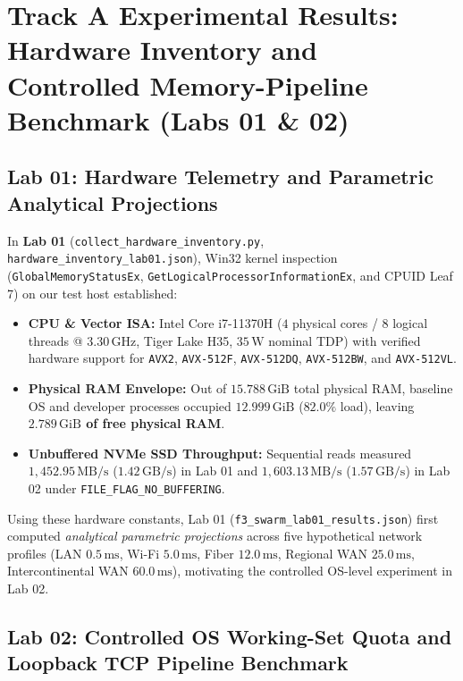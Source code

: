 \documentclass[10pt,a4paper]{article}
\begin{document}
\section{Track A Experimental Results: Hardware Inventory and Controlled Memory-Pipeline Benchmark (Labs 01 \& 02)}

\subsection{Lab 01: Hardware Telemetry and Parametric Analytical Projections}
\label{sec:exp_lab01}

In \textbf{Lab 01} (\texttt{collect\_hardware\_inventory.py}, \texttt{hardware\_inventory\_lab01.json}), Win32 kernel inspection (\texttt{GlobalMemoryStatusEx}, \texttt{GetLogicalProcessorInformationEx}, and CPUID Leaf 7) on our test host established:
\begin{itemize}
    \item \textbf{CPU \& Vector ISA:} Intel Core i7-11370H ($4$ physical cores / $8$ logical threads @ $3.30\,\text{GHz}$, Tiger Lake H35, $35\,\text{W}$ nominal TDP) with verified hardware support for \texttt{AVX2}, \texttt{AVX-512F}, \texttt{AVX-512DQ}, \texttt{AVX-512BW}, and \texttt{AVX-512VL}.
    \item \textbf{Physical RAM Envelope:} Out of $15.788\,\text{GiB}$ total physical RAM, baseline OS and developer processes occupied $12.999\,\text{GiB}$ ($82.0\%$ load), leaving \textbf{$2.789\,\text{GiB}$ of free physical RAM}.
    \item \textbf{Unbuffered NVMe SSD Throughput:} Sequential reads measured $1,452.95\,\text{MB/s}$ ($1.42\,\text{GB/s}$) in Lab 01 and $1,603.13\,\text{MB/s}$ ($1.57\,\text{GB/s}$) in Lab 02 under \texttt{FILE\_FLAG\_NO\_BUFFERING}.
\end{itemize}
Using these hardware constants, Lab 01 (\texttt{f3\_swarm\_lab01\_results.json}) first computed \emph{analytical parametric projections} across five hypothetical network profiles (LAN $0.5\,\text{ms}$, Wi-Fi $5.0\,\text{ms}$, Fiber $12.0\,\text{ms}$, Regional WAN $25.0\,\text{ms}$, Intercontinental WAN $60.0\,\text{ms}$), motivating the controlled OS-level experiment in Lab 02.

\subsection{Lab 02: Controlled OS Working-Set Quota and Loopback TCP Pipeline Benchmark}
\label{sec:exp_lab02}
\end{document}
